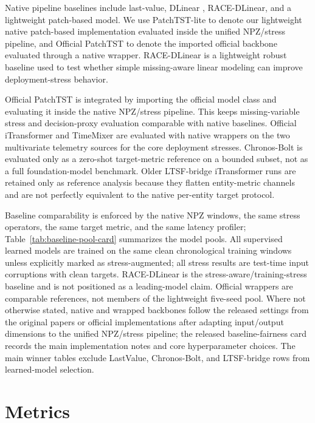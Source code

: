 \documentclass[conference]{IEEEtran}
\begin{document}
Native pipeline baselines include last-value, DLinear \cite{dlinear}, RACE-DLinear, and a lightweight patch-based model. We use PatchTST-lite to denote our lightweight native patch-based implementation evaluated inside the unified NPZ/stress pipeline, and Official PatchTST \cite{patchtst} to denote the imported official backbone evaluated through a native wrapper. RACE-DLinear is a lightweight robust baseline used to test whether simple missing-aware linear modeling can improve deployment-stress behavior.

Official PatchTST is integrated by importing the official model class and evaluating it inside the native NPZ/stress pipeline. This keeps missing-variable stress and decision-proxy evaluation comparable with native baselines. Official iTransformer and TimeMixer \cite{itransformer,timemixer} are evaluated with native wrappers on the two multivariate telemetry sources for the core deployment stresses. Chronos-Bolt \cite{chronos} is evaluated only as a zero-shot target-metric reference on a bounded subset, not as a full foundation-model benchmark. Older LTSF-bridge iTransformer runs are retained only as reference analysis because they flatten entity-metric channels and are not perfectly equivalent to the native per-entity target protocol.

Baseline comparability is enforced by the native NPZ windows, the same stress operators, the same target metric, and the same latency profiler; Table~\ref{tab:baseline-pool-card} summarizes the model pools. All supervised learned models are trained on the same clean chronological training windows unless explicitly marked as stress-augmented; all stress results are test-time input corruptions with clean targets. RACE-DLinear is the stress-aware/training-stress baseline and is not positioned as a leading-model claim. Official wrappers are comparable references, not members of the lightweight five-seed pool. Where not otherwise stated, native and wrapped backbones follow the released settings from the original papers or official implementations after adapting input/output dimensions to the unified NPZ/stress pipeline; the released baseline-fairness card records the main implementation notes and core hyperparameter choices. The main winner tables exclude LastValue, Chronos-Bolt, and LTSF-bridge rows from learned-model selection.



\section{Metrics}
\end{document}
